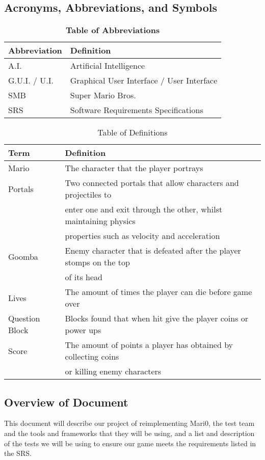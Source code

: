 \documentclass[12pt, titlepage]{article}
\begin{document}
\subsection{Acronyms, Abbreviations, and Symbols}
	
\begin{table}[hbp]
\caption{\textbf{Table of Abbreviations}} \label{Table}

\begin{tabularx}{\textwidth}{p{3cm}X}
\toprule
\textbf{Abbreviation} & \textbf{Definition} \\
\midrule
A.I. & Artificial Intelligence\\
G.U.I. / U.I. & Graphical User Interface / User Interface\\
SMB & Super Mario Bros.\\
SRS & Software Requirements Specifications\\
\bottomrule
\end{tabularx}

\end{table}


\begin{table}
\caption{Table of Definitions}
\begin{tabular}{l l}
\hline
Term			& Definition \\
\hline
Mario      		 & The character that the player portrays  \\
Portals      		 & Two connected portals that allow characters and projectiles to \\
			 & enter one and exit through the other, whilst maintaining physics \\
			 & properties such as velocity and acceleration \\
Goomba		 & Enemy character that is defeated after the player stomps on the top \\
			 & of its head	  \\
Lives			 & The amount of times the player can die before game over	\\
Question Block	 & Blocks found that when hit give the player coins or power ups	\\
Score			 & The amount of points a player has obtained by collecting coins \\
			 & or killing enemy characters	\\
\hline
\end{tabular}
\end{table}

\subsection{Overview of Document}
	This document will describe our project of reimplementing Mari0, the test team and the tools and frameworks that they will be using, and a list and description of the tests we will be using to ensure our game meets the requirements listed in the SRS.
\end{document}
